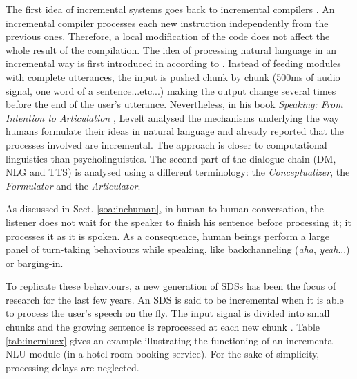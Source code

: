     The first idea of incremental systems goes back to incremental compilers \cite{Lock1965}. An incremental compiler processes each new instruction independently from the previous ones. Therefore, a local modification of the code does not affect the whole result of the compilation. The idea of processing natural language in an incremental way is first introduced in \cite{Wiren1992} according to \cite{Kilger1995}. Instead of feeding modules with complete utterances, the input is pushed chunk by chunk (500ms of audio signal, one word of a sentence...etc...) making the output change several times before the end of the user's utterance. Nevertheless, in his book \textit{Speaking: From Intention to Articulation} \cite{Levelt1989}, Levelt analysed the mechanisms underlying the way humans formulate their ideas in natural language and already reported that the processes involved are incremental. The approach is closer to computational linguistics than psycholinguistics. The second part of the dialogue chain (DM, NLG and TTS) is analysed using a different terminology: the \textit{Conceptualizer}, the \textit{Formulator} and the \textit{Articulator}.

    As discussed in Sect. \ref{soa:inchuman}, in human to human conversation, the listener does not wait for the speaker to finish his sentence before processing it; it processes it as it is spoken. As a consequence, human beings perform a large panel of turn-taking behaviours while speaking, like backchanneling (\textit{aha}, \textit{yeah}...) or barging-in.

    To replicate these behaviours, a new generation of SDSs has been the focus of research for the last few years. An SDS is said to be incremental when it is able to process the user's speech on the fly. The input signal is divided into small chunks and the growing sentence is reprocessed at each new chunk \cite{Schlangen2011}. Table \ref{tab:incrnluex} gives an example illustrating the functioning of an incremental NLU module (in a hotel room booking service). For the sake of simplicity, processing delays are neglected.

